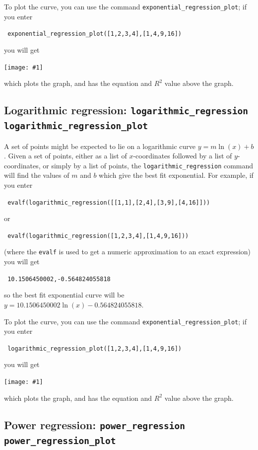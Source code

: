 \documentclass[a4paper,11pt]{book}
\newcommand{\includeimage}[1]
{\texttt{[image: \#1]}}
\begin{document}
To plot the curve, you can use the command
\texttt{exponential\_regression\_plot}; if you enter
\begin{center}
  \tt
    exponential\_regression\_plot([1,2,3,4],[1,4,9,16])
\end{center}
you will get
\begin{center}
  \includeimage{xcas-expregplot.png}
\end{center}
which plots the graph, and has the equation and $R^2$ value above the
graph.

\subsection{Logarithmic regression: \texttt{logarithmic\_regression} \texttt{logarithmic\_regression\_plot}}

A set of points might be expected to lie on a logarithmic curve 
$y=m \ln(x) + b$.  Given a set of points, either as a list of $x$-coordinates
followed by a list of $y$-coordinates, or simply by a list of points,
the \texttt{logarithmic\_regression} command will find the values of
$m$ and $b$ which give the best fit exponential.  For example, if you
enter
\begin{center}
  \tt
  evalf(logarithmic\_regression([[1,1],[2,4],[3,9],[4,16]]))
\end{center}
or
\begin{center}
  \tt
  evalf(logarithmic\_regression([1,2,3,4],[1,4,9,16]))
\end{center}
(where the \texttt{evalf} is used to get a numeric approximation to an
exact expression) you will get
\begin{center}
  \tt
  10.1506450002,-0.564824055818
\end{center}
so the best fit exponential curve will be $y = 10.1506450002 \ln(x)
-0.564824055818$.

To plot the curve, you can use the command
\texttt{exponential\_regression\_plot}; if you enter
\begin{center}
  \tt
    logarithmic\_regression\_plot([1,2,3,4],[1,4,9,16])
\end{center}
you will get
\begin{center}
  \includeimage{xcas-logregplot.png}
\end{center}
which plots the graph, and has the equation and $R^2$ value above the
graph.

\subsection{Power regression: \texttt{power\_regression} \texttt{power\_regression\_plot}}
\end{document}
